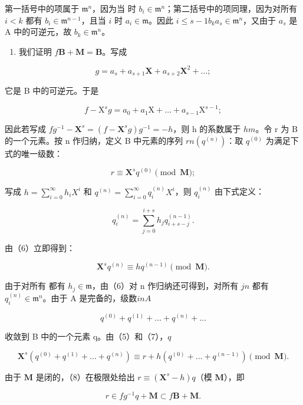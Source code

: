 第一括号中的项属于 \(\mathfrak{m}^n\)，因为当  时 \(b_i \in \mathfrak{m}^n\)；第二括号中的项同理，因为对所有 \(i < k\) 都有 \(b_i \in \mathfrak{m}^{n-1}\)，且当 \(i\) 时 \(a_i \in \mathfrak{m}\)。因此 \(i \leqslant s - 1\)\(b_k a_s \in \mathfrak{m}^n\)，又由于 \(a_s\) 是 A 中的可逆元，故 \(b_k \in \mathfrak{m}^n\)。

\begin{enumerate}
\def\labelenumi{(\alph{enumi})}
\setcounter{enumi}{1}
\tightlist
\item
  我们证明 \(f\mathbf{B} + \mathbf{M} = \mathbf{B}\)。写成
\end{enumerate}

\[
g = a _ {s} + a _ {s + 1} \mathbf {X} + a _ {s + 2} \mathbf {X} ^ {2} + \dots ;
\]

它是 B 中的可逆元。于是

\[
f - \mathrm{X} ^ {s} g = a _ {0} + a _ {1} \mathrm{X} + \dots + a _ {s - 1} \mathrm{X} ^ {s - 1};
\]

因此若写成 \(fg^{-1} - \mathbf{X}^s = (f - \mathbf{X}^s g)g^{-1} = -h\)，则 h 的系数属于 \(h\)\(m\)。令 r 为 B 的一个元素。按 n 作归纳，定义 B 中元素的序列 \(r\)\(n\)\((q^{(n)})\)：取 \(q^{(0)}\) 为满足下式的唯一级数：

\[
r \equiv \mathbf {X} ^ {s} q ^ {(0)} \pmod {\mathbf {M}};\tag{5}
\]

写成 \(h = \sum_{i=0}^{\infty} h_i X^i\) 和 \(q^{(n)} = \sum_{i=0}^{\infty} q_i^{(n)} X^i\)，则 \(q_i^{(n)}\) 由下式定义：

\[
q _ {i} ^ {(n)} = \sum_ {j = 0} ^ {i + s} h _ {j} q _ {i + s - j} ^ {(n - 1)}.\tag{6}
\]

由（6）立即得到：

\[
\mathbf {X} ^ {s} q ^ {(n)} \equiv h q ^ {(n - 1)} \pmod {\mathbf {M}}.\tag{7}
\]

由于对所有  都有 \(h_j \in \mathfrak{m}\)，由（6）对 n 作归纳还可得到，对所有 \(j\)\(n\) 都有 \(q_i^{(n)} \in \mathfrak{m}^n\)。由于 A 是完备的，级数\(i\)\(n\)\(A\)

\[
q ^ {(0)} + q ^ {(1)} + \dots + q ^ {(n)} + \dots
\]

收敛到 B 中的一个元素 q。由（5）和（7），\(q\)

\[
\mathbf {X} ^ {s} (q ^ {(0)} + q ^ {(1)} + \dots + q ^ {(n)}) \equiv r + h (q ^ {(0)} + \dots + q ^ {(n - 1)}) \pmod {\mathbf {M}}. \tag {8}
\]

由于 \(\mathbf{M}\) 是闭的，（8）在极限处给出 \(r \equiv (\mathbf{X}^s - h)q\)（模 \(\mathbf{M}\)），即

\[
r \in f g ^ {- 1} q + \mathbf {M} \subset f \mathbf {B} + \mathbf {M}.
\]

